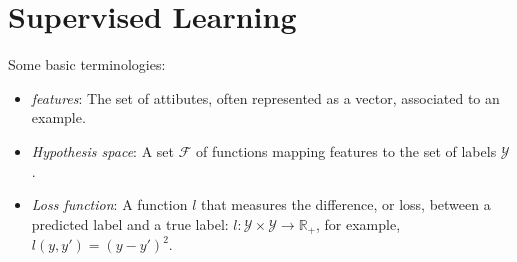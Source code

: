 \documentclass[12pt]{article}
\begin{document}
    \MakeScribeTop

\section{Supervised Learning}
Some basic terminologies:
\begin{itemize}
\item \textit{features}:  The set of attibutes, often represented as a vector, associated to an example.
\item \textit{Hypothesis space}: A set $\mathcal{F}$ of functions mapping features to the set of labels $\mathcal{Y}$.
\item \textit{Loss function}: A function $l$ that measures the difference, or loss, between a predicted label and a true label: $l:\mathcal{Y}×\mathcal{Y}\to \mathbb{R}_{+}$, for example, $l(y,y')=(y-y')^{2}$.
\end{itemize}


\end{document}
